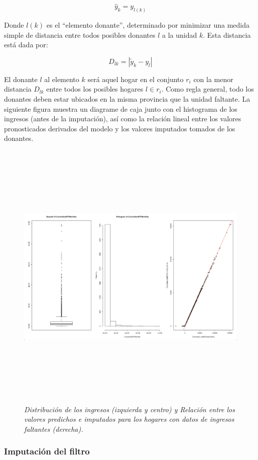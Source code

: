 \[\hat{y}_k = y_{l(k)}\]

Donde \(l(k)\) es el ``elemento donante'', determinado por minimizar una medida simple de distancia entre todos posibles donantes \(l\) a la unidad \(k\). Esta distancia está dada por:

\[
D_{lk} = |\tilde y_k - y_l|
\]

El donante \(l\) al elemento \(k\) será aquel hogar en el conjunto \(r_i\) con la menor distancia \(D_{lk}\) entre todos los posibles hogares \(l\in r_i\). Como regla general, todo los donantes deben estar ubicados en la misma provincia que la unidad faltante. La siguiente figura muestra un diagrame de caja junto con el histograma de los ingresos (antes de la imputación), así como la relación lineal entre los valores pronosticados derivados del modelo y los valores imputados tomados de los donantes.

\begin{figure}
\centering
\includegraphics[width=\textwidth,height=5.20833in]{Pics/10.png}
\caption{\emph{Distribución de los ingresos (izquierda y centro) y Relación entre los valores predichos e imputados para los hogares con datos de ingresos faltantes (derecha).}}
\end{figure}

\hypertarget{imputacion-del-filtro}{%
\subsubsection*{Imputación del filtro}\label{imputacion-del-filtro}}


